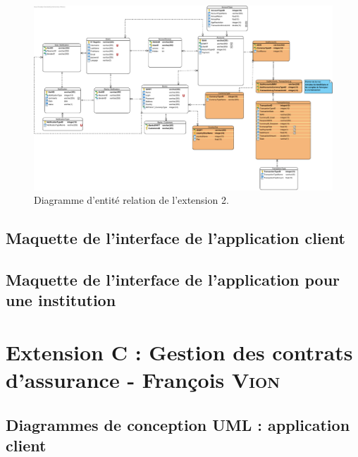 \documentclass[]{report}
\begin{document}
\begin{figure}[h]
	\centering\includegraphics[width=\linewidth]{img/BDD - Extension 2.pdf}
	\caption{Diagramme d'entité relation de l'extension 2.}
\end{figure}


\newpage

\section{Maquette de l'interface de l'application client}



\newpage

\section{Maquette de l'interface de l'application pour une institution}







\chapter{Extension C : Gestion des contrats d’assurance - François \textsc{Vion}}



\newpage



\section{Diagrammes de conception UML : application client}
\end{document}
